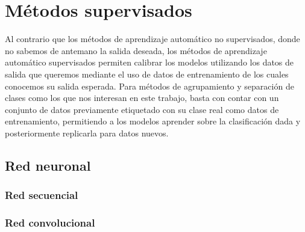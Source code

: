 \newpage
\section{Métodos supervisados}
Al contrario que los métodos de aprendizaje automático no supervisados, donde no sabemos de antemano la salida deseada, los métodos de aprendizaje automático supervisados permiten calibrar los modelos utilizando los datos de salida que queremos mediante el uso de datos de entrenamiento de los cuales conocemos su salida esperada. Para métodos de agrupamiento y separación de clases como los que nos interesan en este trabajo, basta con contar con un conjunto de datos previamente etiquetado con su clase real como datos de entrenamiento, permitiendo a los modelos aprender sobre la clasificación dada y posteriormente replicarla para datos nuevos.

\cite{pytorch}
\subsection{Red neuronal}

\subsubsection*{Red secuencial}

\subsubsection*{Red convolucional}